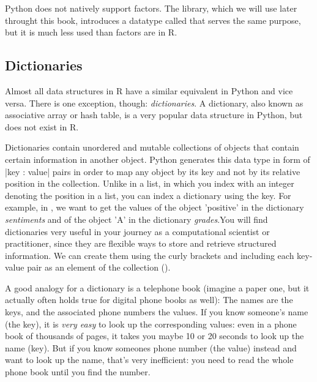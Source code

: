 
Python does not natively support factors. The  library,
which we will use later throught this book, introduces a datatype called
 that serves the same purpose, but it is much less
used than factors are in R.



\subsection{Dictionaries}
Almost all data structures in R have a similar equivalent in Python
and vice versa. There is one exception, though: \emph{dictionaries}. A
dictionary, also known as associative array or hash table, is a very
popular data structure in Python, but does not exist in R.

Dictionaries contain unordered and mutable collections of objects that
contain certain information in another object. Python generates this
data type in form of |{key : value}| pairs in order
to map any object by its key and not by its relative position in the
collection. Unlike in a list, in which you index with an integer denoting
the position in a list, you can index a dictionary using the key.
For example, in , we want to get the values of the object 'positive' in the
dictionary \emph{sentiments} and of the object 'A' in the dictionary
\emph{grades}.You will
find dictionaries very useful in your journey as a computational
scientist or practitioner, since they are flexible ways to store and
retrieve structured information. We can create them using the curly
brackets {} and including each key-value pair as an element of the
collection ().


A good analogy for a dictionary is a telephone book (imagine a paper
one, but it actually often holds true for digital phone books as
well): The names are the keys, and the associated phone numbers the
values. If you know someone's name (the key), it is \emph{very easy}
to look up the corresponding values: even in a phone book of thousands
of pages, it takes you maybe 10 or 20 seconds to look up the name
(key). But if you know someones phone number (the value) instead and
want to look up the name, that's very inefficient: you need to read
the whole phone book until you find the number.

